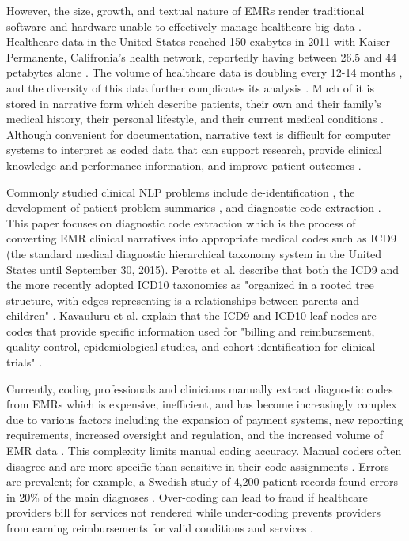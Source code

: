 \documentclass[sigconf]{acmart}
\begin{document}
However, the size, growth, and textual nature of EMRs render traditional software and hardware unable to effectively manage healthcare big data \cite{raghupathi2014big}. Healthcare data in the United States reached 150 exabytes in 2011 with Kaiser Permanente, Califronia's health network, reportedly having between 26.5 and 44 petabytes alone \cite{cottle2013transforming}. The volume of healthcare data is doubling every 12-14 months \cite{dinov2016volume}, and the diversity of this data further complicates its analysis \cite{frost2015drowning}. Much of it is stored in narrative form which describe patients, their own and their family's medical history, their personal lifestyle, and their current medical conditions \cite{meystre2008extracting}. Although convenient for documentation, narrative text is difficult for computer systems to interpret as coded data that can support research, provide clinical knowledge and performance information, and improve patient outcomes \cite{meystre2008extracting} \cite{stanfill2010systematic}.

Commonly studied clinical NLP problems include de-identification \cite{velupillai2015recent}, the development of patient problem summaries \cite{diomaiuta2017novel}, and diagnostic code extraction \cite{perotte2013diagnosis}. This paper focuses on diagnostic code extraction which is the process of converting EMR clinical narratives into appropriate medical codes such as ICD9 (the standard medical diagnostic hierarchical taxonomy system in the United States until September 30, 2015). Perotte et al. describe that both the ICD9 and the more recently adopted ICD10 taxonomies as "organized in a rooted tree structure, with edges representing is-a relationships between parents and children" \cite{perotte2013diagnosis}. Kavauluru et al. explain that the ICD9 and ICD10 leaf nodes are codes that provide specific information used for "billing and reimbursement, quality control, epidemiological studies, and cohort identification for clinical trials" \cite{kavuluru2015empirical}.

Currently, coding professionals and clinicians manually extract diagnostic codes from EMRs which is expensive, inefficient, and has become increasingly complex due to various factors including the expansion of payment systems, new reporting requirements, increased oversight and regulation, and the increased volume of EMR data \cite{AHIMA} \cite{pons2016natural} \cite{stanfill2010systematic} \cite{velupillai2015recent}. This complexity limits manual coding accuracy. Manual coders often disagree \cite{pestian2007shared} and are more specific than sensitive in their code assignments \cite{birman2005accuracy}. Errors are prevalent; for example, a Swedish study of 4,200 patient records found errors in 20\% of the main diagnoses \cite{velupillai2015recent}. Over-coding can lead to fraud if healthcare providers bill for services not rendered while under-coding prevents providers from earning reimbursements for valid conditions and services \cite{perotte2013diagnosis}.
\end{document}
